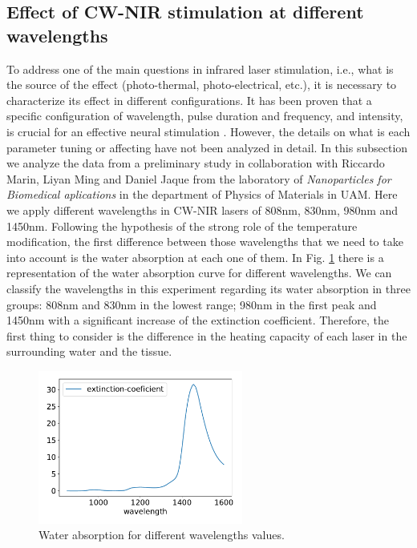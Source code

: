 \subsection{Effect of CW-NIR stimulation at different wavelengths}
\label{subsec:wavelengths}
To address one of the main questions in infrared laser stimulation, i.e., what is the source of the effect (photo-thermal, photo-electrical, etc.), it is necessary to characterize its effect in different configurations. It has been proven that a specific configuration of wavelength, pulse duration and frequency, and intensity, is crucial for an effective neural stimulation \parencite{izzo_optical_2007,wells_biophysical_2007}. However, the details on what is each parameter tuning or affecting  have not been analyzed in detail. In this subsection we analyze the data from a preliminary study in collaboration with Riccardo Marin, Liyan Ming and Daniel Jaque from the laboratory of \textit{Nanoparticles for Biomedical aplications} in the department of Physics of Materials in UAM. Here we apply different wavelengths in CW-NIR lasers of 808nm, 830nm, 980nm and 1450nm. Following the hypothesis of the strong role of the temperature modification, the first difference between those wavelengths that we need to take into account is the water absorption at each one of them. In Fig. \ref{fig:water absorption} there is a representation of the water absorption curve for different wavelengths. We can classify the wavelengths in this experiment regarding its water absorption in three groups: 808nm and 830nm in the lowest range; 980nm in the first peak and 1450nm with a significant increase of the extinction coefficient. Therefore, the first thing to consider is the difference in the heating capacity of each laser in the surrounding water and the tissue. 

\begin{figure}[hbt]
	\centering
	\includegraphics[width=0.6\textwidth]{img/laser/wavelength/water_absoption_wavelength.pdf}
    \caption{Water absorption for different wavelengths values.}
    \label{fig:water absorption}
\end{figure}


